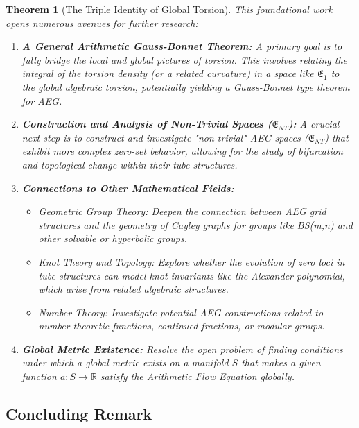 \documentclass[12pt]{article}
\newtheorem{theorem}{Theorem}[section]
\begin{document}
\begin{theorem}[The Triple Identity of Global Torsion]
This foundational work opens numerous avenues for further research:

\begin{enumerate}[label=\textbf{F\arabic*.}, leftmargin=*, widest=F6, align=left]
    \item \textbf{A General Arithmetic Gauss-Bonnet Theorem:} A primary goal is to fully bridge the local and global pictures of torsion. This involves relating the integral of the torsion density (or a related curvature) in a space like \( \mathfrak{E}_1 \) to the global algebraic torsion, potentially yielding a Gauss-Bonnet type theorem for AEG.

    \item \textbf{Construction and Analysis of Non-Trivial Spaces (\( \mathfrak{E}_{NT} \)):} A crucial next step is to construct and investigate "non-trivial" AEG spaces (\( \mathfrak{E}_{NT} \)) that exhibit more complex zero-set behavior, allowing for the study of bifurcation and topological change within their tube structures.

    \item \textbf{Connections to Other Mathematical Fields:}
        \begin{itemize}
            \item \textit{Geometric Group Theory:} Deepen the connection between AEG grid structures and the geometry of Cayley graphs for groups like BS(m,n) and other solvable or hyperbolic groups.
            \item \textit{Knot Theory and Topology:} Explore whether the evolution of zero loci in tube structures can model knot invariants like the Alexander polynomial, which arise from related algebraic structures.
            \item \textit{Number Theory:} Investigate potential AEG constructions related to number-theoretic functions, continued fractions, or modular groups.
        \end{itemize}

    \item \textbf{Global Metric Existence:} Resolve the open problem of finding conditions under which a global metric exists on a manifold \( S \) that makes a given function \( a: S \to \mathbb{R} \) satisfy the Arithmetic Flow Equation globally.
\end{enumerate}

\subsection{Concluding Remark}


\end{theorem}
\end{document}

